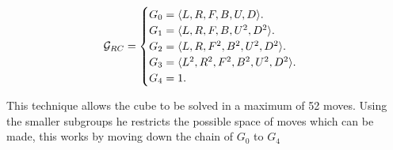 \documentclass{article}
\DeclarePairedDelimiter{\opair}{\langle}{\rangle}
\begin{document}
\begin{equation}
  \mathcal{G}_{RC}=\begin{cases}
    G_{0} = \text{$\opair{L,R,F,B,U,D}$}.\\
    G_{1} = \text{$\opair{L,R,F,B,U^{2},D^{2}}$}.\\
    G_{2} = \text{$\opair{L,R,F^{2},B^{2},U^{2},D^{2}}$}.\\
    G_{3} = \text{$\opair{L^{2},R^{2},F^{2},B^{2},U^{2},D^{2}}$}.\\
    G_{4} = \text{1}.
  \end{cases}
\end{equation}

This technique allows the cube to be solved in a maximum of 52 moves. Using the smaller subgroups he restricts the possible space of moves which can be made, this works by moving down the chain of $G_{0}$ to $G_{4}$

\newpage
 
\newpage



\end{document}

